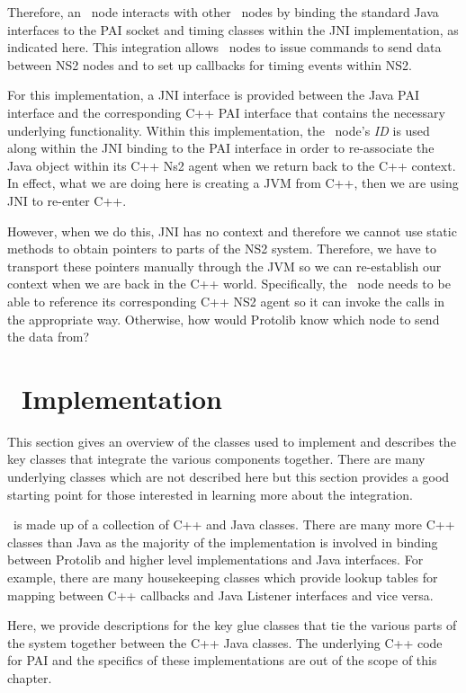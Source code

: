 Therefore, an \agentj~node interacts with other \agentj~nodes 
by binding the standard Java interfaces to the PAI 
socket and timing classes within the JNI implementation, as 
indicated here. This integration allows \agentj~nodes to issue 
commands to send data between NS2 nodes and to set up callbacks
for timing events within NS2. 

For this implementation, a JNI interface is provided 
between the Java PAI interface and the corresponding C++ PAI 
interface that contains the necessary underlying 
functionality. Within this implementation, the \agentj~node's 
\emph{ID} is used along within the JNI binding to the 
PAI interface in order to re-associate the Java object within its 
C++ Ns2 agent when we return back to the C++ context.
In effect, what we are doing here is creating a JVM from C++,
then we are using JNI to re-enter C++. 

However, when we do 
this, JNI has no context and therefore we cannot use static
methods to obtain pointers to parts of the NS2 system. Therefore,
we have to transport these pointers manually through the JVM
so we can re-establish our context when we are back in the
C++ world. Specifically, the \agentj~node needs to be able to 
reference its corresponding C++ NS2 agent so it can invoke
the calls in the appropriate way. Otherwise, how would Protolib
know which node to send the data from?

\section{\agentj~Implementation}
\label{agentj:classes}

This section gives an overview of the classes used to implement
\agentj and describes the key classes that integrate the 
various components together.  There are many underlying 
classes which are not described here but this section
provides a good starting point for those interested in learning 
more about the integration.
 
\agentj~is made up of a collection of C++ and Java classes.  There
are many more C++ classes than Java as the majority of the
implementation is involved in binding between Protolib and
higher level implementations and Java interfaces. For example,
there are many housekeeping classes which provide lookup
tables for mapping between C++ callbacks and Java Listener 
interfaces and vice versa.  

Here, we provide descriptions for the key glue classes that tie the
various parts of the system together between the C++ Java 
classes. The underlying C++ code for PAI and the specifics
of these implementations are out of the scope of this chapter.  


